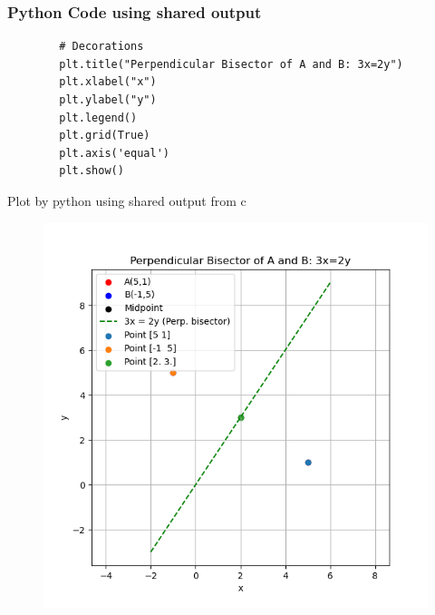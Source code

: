 \documentclass{beamer}
\begin{document}
\begin{frame}[fragile]
	\frametitle{Python Code using shared output}
	\begin{lstlisting}
		# Decorations
		plt.title("Perpendicular Bisector of A and B: 3x=2y")
		plt.xlabel("x")
		plt.ylabel("y")
		plt.legend()
		plt.grid(True)
		plt.axis('equal')
		plt.show()
	\end{lstlisting}
\end{frame}

\begin{frame}{Plot by python using shared output from c}
	\begin{center}
	\begin{figure}[H]
		\centering
		\includegraphics[width = 0.6\columnwidth]{figs/fig.png}
		\caption*{}
		\label{}
	\end{figure}
	\end{center}
\end{frame}
\end{document}
